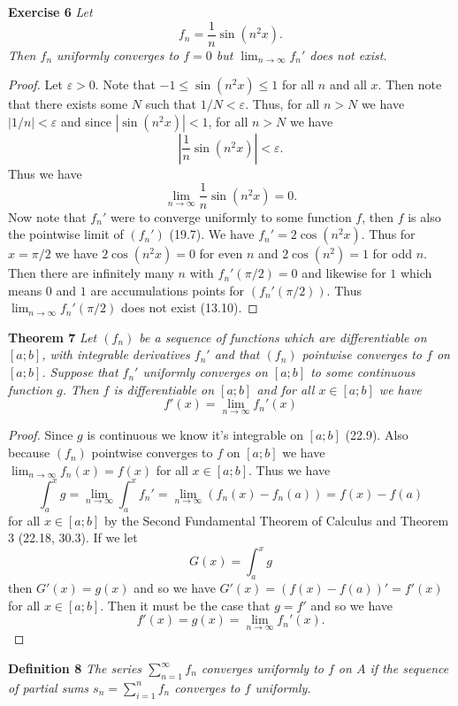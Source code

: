 \documentclass{article}
\begin{document}
\begin{flushleft}
\textbf{Exercise 6}
\textsl{Let
\[
f_n = \frac{1}{n} \sin (n^2x).
\]
Then $f_n$ uniformly converges to $f=0$ but $\lim_{n \rightarrow \infty} f_n'$ does not exist.}
\begin{proof}
Let $\varepsilon > 0$. Note that $-1 \leq \sin (n^2x) \leq 1$ for all $n$ and all $x$. Then note that there exists some $N$ such that $1/N < \varepsilon$. Thus, for all $n>N$ we have $|1/n| < \varepsilon$ and since $|\sin (n^2 x)| < 1$, for all $n>N$ we have
\[
\left | \frac{1}{n} \sin (n^2 x) \right | < \varepsilon.
\]
Thus we have
\[
\lim_{n \rightarrow \infty} \frac{1}{n} \sin (n^2 x) = 0.
\]
Now note that $f_n'$ were to converge uniformly to some function $f$, then $f$ is also the pointwise limit of $(f_n')$ (19.7). We have $f_n' = 2 \cos (n^2 x)$. Thus for $x = \pi/2$ we have $2 \cos (n^2 x) = 0$ for even $n$ and $2 \cos (n^2) = 1$ for odd $n$. Then there are infinitely many $n$ with $f_n' (\pi/2) = 0$ and likewise for $1$ which means $0$ and $1$ are accumulations points for $(f_n' (\pi/2))$. Thus $\lim_{n \rightarrow \infty} f_n' (\pi/2)$ does not exist (13.10).
\end{proof}

\textbf{Theorem 7}
\textsl{Let $(f_n)$ be a sequence of functions which are differentiable on $[a;b]$, with integrable derivatives $f_n'$ and that $(f_n)$ pointwise converges to $f$ on $[a;b]$. Suppose that $f_n'$ uniformly converges on $[a;b]$ to some continuous function $g$. Then $f$ is differentiable on $[a;b]$ and for all $x \in [a;b]$ we have
\[
f'(x) = \lim_{n \rightarrow \infty} f_n' (x)
\]}
\begin{proof}
Since $g$ is continuous we know it's integrable on $[a;b]$ (22.9). Also because $(f_n)$ pointwise converges to $f$ on $[a;b]$ we have $\lim_{n \rightarrow \infty} f_n (x) = f(x)$ for all $x \in [a;b]$. Thus we have
\[
\int_a^x g = \lim_{n \rightarrow \infty} \int_a^x f_n' = \lim_{n \rightarrow \infty} (f_n(x) - f_n(a)) = f(x) - f(a)
\]
for all $x \in [a;b]$ by the Second Fundamental Theorem of Calculus and Theorem 3 (22.18, 30.3). If we let
\[
G(x) = \int_a^x g
\]
then $G'(x) = g(x)$ and so we have $G'(x) = (f(x) - f(a))' = f'(x)$ for all $x \in [a;b]$. Then it must be the case that $g = f'$ and so we have
\[
f'(x) = g(x) = \lim_{n \rightarrow \infty} f_n' (x).
\]
\end{proof}

\textbf{Definition 8}
\textsl{The series $\sum_{n=1}^{\infty} f_n$ converges uniformly to $f$ on $A$ if the sequence of partial sums $s_n = \sum_{i=1}^n f_n$ converges to $f$ uniformly.}\newline


\end{flushleft}
\end{document}
